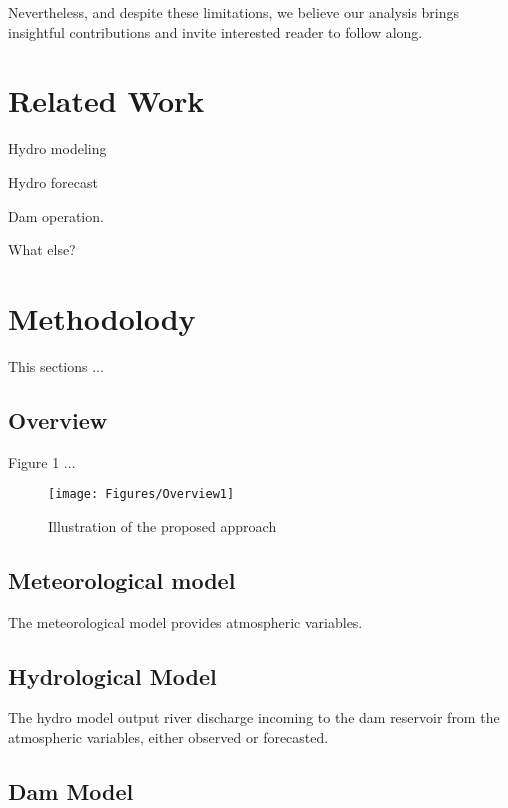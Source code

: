 \documentclass{article}
\begin{document}
Nevertheless, and despite these limitations,
we believe our analysis brings insightful contributions
and invite interested reader to follow along.

\section{Related Work}
\label{sec:Related Work}

Hydro modeling

Hydro forecast

Dam operation.

What else?

\section{Methodolody}
\label{sec:Methodolody}

This sections ...

\subsection{Overview}
\label{sec:Overview}

Figure 1 ...


\begin{figure}[t]
  \centering
  \texttt{[image: Figures/Overview1]} %
  \caption[First figure]{Illustration of the proposed approach}
\end{figure}



\subsection{Meteorological model}
\label{sec:Meteorological model}

The meteorological model provides atmospheric variables.


\subsection{Hydrological Model}
\label{Hydrological Model}

The hydro model output river discharge incoming to the dam reservoir
from the atmospheric variables, either observed or forecasted.

\subsection{Dam Model}
\label{Dam Model}
\end{document}
